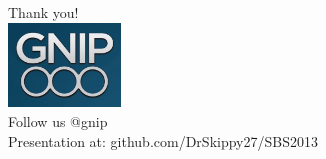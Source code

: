 \documentclass{beamer}
\begin{document}
\begin{frame}
  \begin{center}
  \Large{Thank you!  \\ [20pt]}
    \includegraphics[width=3cm]{./imgs/logo.png} \\ [15pt]
   \Large{Follow us @gnip \\ [10pt] Presentation at: github.com/DrSkippy27/SBS2013 }
  \end{center}
\end{frame}
\end{document}
